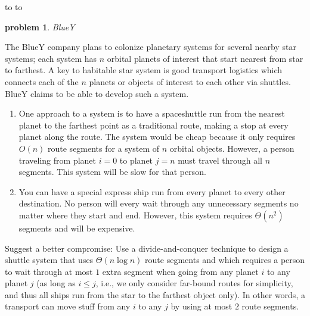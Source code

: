 \documentclass[11pt]{article}
\newcommand{\handout}{
   \renewcommand{\thepage}{H\hnumber-\arabic{page}}%
   \noindent%
   \begin{center}%
      \vbox{%
    \hbox to \columnwidth {\sc{\course} --- abhi shelat \hfill}%
    \vspace{-2mm}%
    \hbox to \columnwidth {\sc due \MakeLowercase{\duedate} \duelocation\hfill {\Huge\color{mdb}H\hnumber.\yourname}}%
      }
   \end{center}
   \vspace*{2mm}
}
\newtheorem{problem}{\sc\color{cit}problem}
\begin{document}
\handout
   

\begin{problem}BlueY\end{problem}
The BlueY company plans to colonize planetary systems for several nearby star systems; each system has $n$ orbital planets of interest that start nearest from star to farthest.  A key to habitable star system is good transport logistics which connects each of the $n$ planets or objects of interest to each other via shuttles.
BlueY claims to be able to develop such a system.

\begin{enumerate}
\item One approach to a system is to have a spaceshuttle run from the nearest planet to the farthest point as a traditional route, making a stop at every planet along the route. The system would be cheap because it only requires $O(n)$ route segments for a system of $n$ orbital objects. However, a person traveling from planet $i=0$ to planet $j=n$ must travel through all $n$ segments.  This system will be slow for that person.

\item You can have a special express ship run from every planet to every other destination. No person will every wait through any unnecessary segments no matter where they start and end.  However, this system requires $\Theta(n^2)$ segments and will be expensive.
\end{enumerate}

Suggest a better compromise: Use a divide-and-conquer technique to design a shuttle system that uses $\Theta(n\log n)$ route segments and which requires a person to wait through at most $1$ extra segment when going from any planet $i$ to any planet $j$  (as long as $i\leq j$, i.e., we only consider far-bound routes for simplicity, and thus all ships run from the star to the farthest object only).
In other words, a transport can move stuff from any $i$ to any $j$ by using at most $2$ route segments.

\hfill
   
\end{document}
